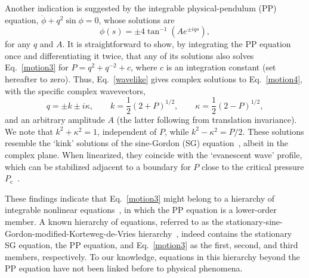 \documentclass[prl,twocolumn,showpacs]{revtex4}
\begin{document}
Another indication is suggested by the integrable physical-pendulum (PP)
equation, $\ddot{\phi}+q^2\sin\phi=0$, whose solutions are
\begin{equation}
  \phi(s) = \pm 4\tan^{-1}(A e^{\pm iqs}),
  \label{wavelike}
\end{equation}
for any $q$ and $A$. It is straightforward to show, by integrating the
PP equation once and differentiating it twice, that any of its
solutions also solves Eq.~\eqref{motion3} for $P=q^2+q^{-2}+c$, where
$c$ is an integration constant (set hereafter to zero). Thus,
Eq.~\eqref{wavelike} gives complex solutions to Eq.~\eqref{motion4}, with
the specific complex wavevectors,
\begin{equation}
  q = \pm k \pm i\kappa,
  \qquad
  k = \frac{1}{2}(2+P)^{1/2},
  \qquad
  \kappa = \frac{1}{2}(2-P)^{1/2},
  \label{eqq}
\end{equation}
and an arbitrary amplitude $A$ (the latter following from translation
invariance). We note that $k^2+\kappa^2=1$, independent of $P$, while
$k^2-\kappa^2=P/2$. These solutions resemble the `kink' solutions of
the sine-Gordon (SG) equation~\cite{Infeld,Newell}, albeit in the
complex plane. When linearized, they coincide with the `evanescent
wave' profile, which can be stabilized adjacent to a boundary for $P$
close to the critical pressure $P_{\mathrm{c}}$~\cite{DWpreprint}.

These findings indicate that Eq.~\eqref{motion3} might belong to a
hierarchy of integrable nonlinear equations~\cite{Newell,Gesztesy}, in
which the PP equation is a lower-order member. A known hierarchy of
equations, referred to as the
stationary-sine-Gordon-modified-Korteweg-de-Vries
hierarchy~\cite{Gesztesy}, indeed contains the stationary SG equation, the PP
equation, and Eq.~\eqref{motion3} as the first, second, and third
members, respectively. To our knowledge, equations in this hierarchy
beyond the PP equation have not been linked before to physical
phenomena.
\end{document}
